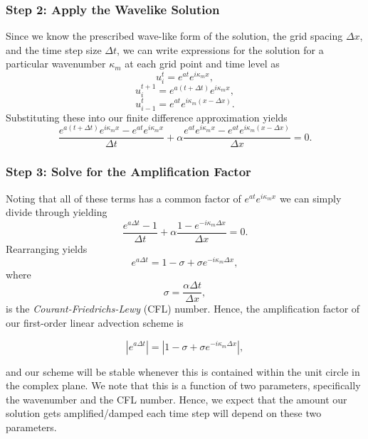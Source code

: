 \subsubsection{Step 2: Apply the Wavelike Solution}
Since we know the prescribed wave-like form of the solution, the grid spacing $\Delta x$, and the time step size $\Delta t$, we can write expressions for the solution for a particular wavenumber $\kappa_m$ at each grid point and time level as
\begin{equation}
	u_{i}^t = e^{at} e^{i \kappa_m x},
\end{equation}
\begin{equation}
	u_{i}^{t+1} = e^{a(t+\Delta t)} e^{i \kappa_m x},
\end{equation}
\begin{equation}
	u_{i-1}^t = e^{at} e^{i \kappa_m (x-\Delta x)}.
\end{equation}
Substituting these into our finite difference approximation yields
\begin{equation}
	\frac{e^{a(t+\Delta t)} e^{i \kappa_m x} - e^{at} e^{i \kappa_m x}}{\Delta t} +  \alpha \frac{e^{at} e^{i \kappa_m x} - e^{at} e^{i \kappa_m (x-\Delta x)}}{\Delta x} = 0.
\end{equation}

\subsubsection{Step 3: Solve for the Amplification Factor}
Noting that all of these terms has a common factor of $e^{at} e^{i \kappa_m x}$ we can simply divide through yielding
\begin{equation}
	\frac{e^{a\Delta t} - 1}{\Delta t} +  \alpha \frac{1 - e^{-i \kappa_m \Delta x}}{\Delta x} = 0.
\end{equation}
Rearranging yields
\begin{equation}
	e^{a\Delta t} = 1 - \sigma + \sigma e^{-i \kappa_m \Delta x},
\end{equation}
where
\begin{equation}
	\sigma = \frac{\alpha \Delta t}{\Delta x},
\end{equation}
is the {\it Courant-Friedrichs-Lewy} (CFL) number. Hence, the amplification factor of our first-order linear advection scheme is 
\begin{eqBox}
\begin{equation}
	|e^{a\Delta t}| = |1 - \sigma + \sigma e^{-i \kappa_m \Delta x}|,
\end{equation}
\end{eqBox}
and our scheme will be stable whenever this is contained within the unit circle in the complex plane. We note that this is a function of two parameters, specifically the wavenumber and the CFL number. Hence, we expect that the amount our solution gets amplified/damped each time step will depend on these two parameters.


